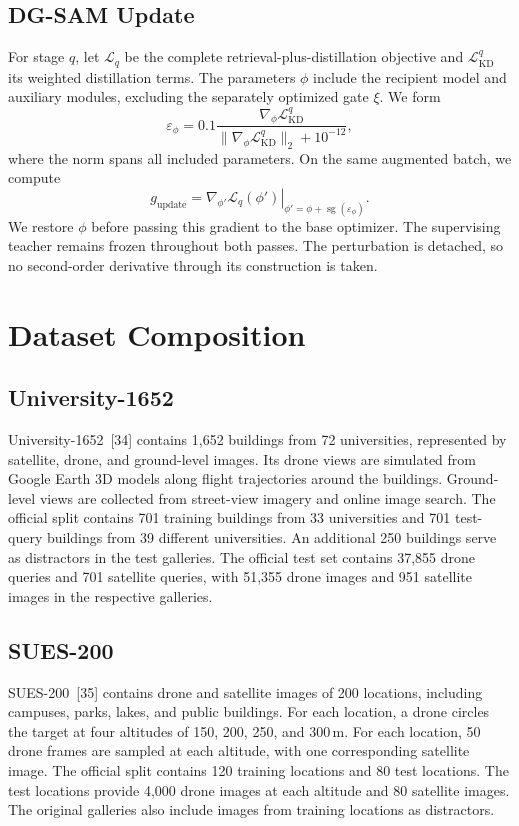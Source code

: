 \subsection{DG-SAM Update}
\label{sec:supp-dgsam}
For stage $q$, let $\mathcal L_q$ be the complete retrieval-plus-distillation objective and $\mathcal L_{\mathrm{KD}}^q$ its weighted distillation terms. The parameters $\phi$ include the recipient model and auxiliary modules, excluding the separately optimized gate $\xi$. We form
\begin{equation}
\varepsilon_\phi=0.1\frac{\nabla_\phi\mathcal L_{\mathrm{KD}}^q}{\|\nabla_\phi\mathcal L_{\mathrm{KD}}^q\|_2+10^{-12}},
\end{equation}
where the norm spans all included parameters. On the same augmented batch, we compute
\begin{equation}
g_{\mathrm{update}}=\left.\nabla_{\phi'}\mathcal L_q(\phi')\right|_{\phi'=\phi+\operatorname{sg}(\varepsilon_\phi)}.
\end{equation}
We restore $\phi$ before passing this gradient to the base optimizer. The supervising teacher remains frozen throughout both passes. The perturbation is detached, so no second-order derivative through its construction is taken.

\section{Dataset Composition}
\subsection{University-1652}
University-1652~[34] contains 1,652 buildings from 72 universities, represented by satellite, drone, and ground-level images. Its drone views are simulated from Google Earth 3D models along flight trajectories around the buildings. Ground-level views are collected from street-view imagery and online image search. The official split contains 701 training buildings from 33 universities and 701 test-query buildings from 39 different universities. An additional 250 buildings serve as distractors in the test galleries. The official test set contains 37,855 drone queries and 701 satellite queries, with 51,355 drone images and 951 satellite images in the respective galleries.

\subsection{SUES-200}
SUES-200~[35] contains drone and satellite images of 200 locations, including campuses, parks, lakes, and public buildings. For each location, a drone circles the target at four altitudes of 150, 200, 250, and 300\,m. For each location, 50 drone frames are sampled at each altitude, with one corresponding satellite image. The official split contains 120 training locations and 80 test locations. The test locations provide 4,000 drone images at each altitude and 80 satellite images. The original galleries also include images from training locations as distractors.

